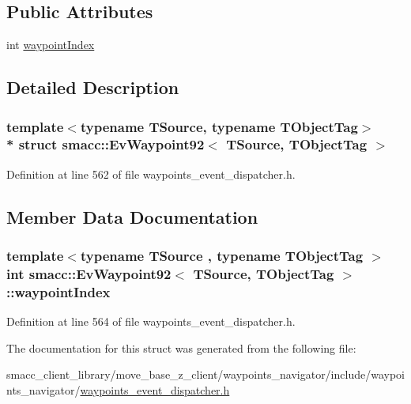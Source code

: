 \subsection*{Public Attributes}
\begin{DoxyCompactItemize}
\item 
int \hyperlink{structsmacc_1_1EvWaypoint92_af2501c4c45ca038c6865ce5ae9032422}{waypoint\+Index}
\end{DoxyCompactItemize}


\subsection{Detailed Description}
\subsubsection*{template$<$typename T\+Source, typename T\+Object\+Tag$>$\\*
struct smacc\+::\+Ev\+Waypoint92$<$ T\+Source, T\+Object\+Tag $>$}



Definition at line 562 of file waypoints\+\_\+event\+\_\+dispatcher.\+h.



\subsection{Member Data Documentation}
\subsubsection[{\texorpdfstring{waypoint\+Index}{waypointIndex}}]{\setlength{\rightskip}{0pt plus 5cm}template$<$typename T\+Source , typename T\+Object\+Tag $>$ int {\bf smacc\+::\+Ev\+Waypoint92}$<$ T\+Source, T\+Object\+Tag $>$\+::waypoint\+Index}\hypertarget{structsmacc_1_1EvWaypoint92_af2501c4c45ca038c6865ce5ae9032422}{}\label{structsmacc_1_1EvWaypoint92_af2501c4c45ca038c6865ce5ae9032422}


Definition at line 564 of file waypoints\+\_\+event\+\_\+dispatcher.\+h.



The documentation for this struct was generated from the following file\+:\begin{DoxyCompactItemize}
\item 
smacc\+\_\+client\+\_\+library/move\+\_\+base\+\_\+z\+\_\+client/waypoints\+\_\+navigator/include/waypoints\+\_\+navigator/\hyperlink{waypoints__event__dispatcher_8h}{waypoints\+\_\+event\+\_\+dispatcher.\+h}\end{DoxyCompactItemize}
